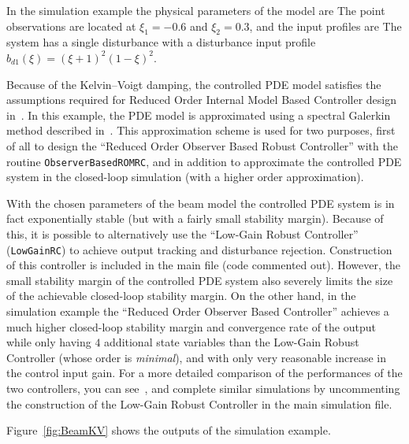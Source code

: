 \documentclass[11pt, a4paper]{amsart}
\theoremstyle{definition}
\numberwithin{equation}{section}
\begin{document}
In the simulation example the physical parameters of the model are 
The point observations are located at $\xi_1=-0.6$ and $\xi_2=0.3$, and the input profiles are
The system has a
single disturbance with a disturbance input profile 
$b_{d1}(\xi) = (\xi+1)^2(1-\xi)^2$.


Because of the Kelvin--Voigt damping, the controlled PDE model satisfies the assumptions required for Reduced Order Internal Model Based Controller design in~\cite{PauPha20}.
In this example, the PDE model is approximated using a spectral Galerkin method described in~\cite{She95}. This approximation scheme is used for two purposes, first of all to design the ``Reduced Order Observer Based Robust Controller'' with the routine \texttt{ObserverBasedROMRC}, and in addition to approximate the controlled PDE system in the closed-loop simulation (with a higher order approximation).

With the chosen parameters of the beam model the controlled PDE system is in fact exponentially stable (but with a fairly small stability margin). Because of this, it is possible to alternatively use the ``Low-Gain Robust Controller'' (\texttt{LowGainRC}) to achieve output tracking and disturbance rejection. Construction of this controller is included in the main file (code commented out). However, the small stability margin of the controlled PDE system also severely limits the size of the achievable closed-loop stability margin. On the other hand, in the simulation example the ``Reduced Order Observer Based Controller'' achieves a much higher closed-loop stability margin and convergence rate of the output while only having $4$ additional state variables than the Low-Gain Robust Controller (whose order is \emph{minimal}), and with only very reasonable increase in the control input gain. For a more detailed comparison of the performances of the two controllers, you can see~, and complete similar simulations by uncommenting the construction of the Low-Gain Robust Controller in the main simulation file.



Figure~\ref{fig:BeamKV} shows the outputs of the simulation example.
\end{document}
